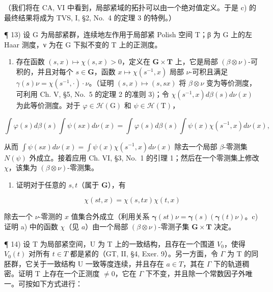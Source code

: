 （我们将在 CA, VI 中看到，局部紧域的拓扑可以由一个绝对值定义。于是 c) 的最终结果将成为 TVS, I, §2, No.~4 的定理 3 的特例。）

¶ 13) 设 G 为局部紧群，连续地左作用于局部紧 Polish 空间 T；β 为 G 上的左 Haar 测度，ν 为在 G 下拟不变的 T 上的正测度。

\begin{enumerate}
\def\labelenumi{\alph{enumi})}
\tightlist
\item
  存在函数 \((s,x)\mapsto \chi (s,x) > 0\)，定义在 \(\mathbf{G}\times \mathbf{T}\) 上，它是局部 \((\beta \otimes \nu)\)-可积的，并且对每个 \(s\in \mathbf{G}\)，函数 \(x\mapsto \chi (s^{-1},x)\) 局部 \(\nu\)-可积且满足 \(\gamma(s)\nu = \chi(s^{-1},\cdot)\cdot\nu\)。（证明 \((s,x)\mapsto(s,sx)\) 将 \(\beta\otimes\nu\) 变为等价测度，可利用 Ch. V, §5, No.~5 的定理 2 的准则 3)；令 \(\chi(s^{-1},x)d\beta(s)d\nu(x)\) 为此等价测度。对于 \(\varphi\in\mathcal{H}(\mathrm{G})\) 和 \(\psi\in\mathcal{H}(\mathrm{T})\)，
\end{enumerate}

\[
\int \varphi (s) d \beta (s) \int \psi (s x) d \nu (x) = \int \varphi (s) d \beta (s) \int \psi (x) \chi (s ^ {- 1}, x) d \nu (x),
\]

从而 \(\int \psi(sx) d\nu(x) = \int \psi(x)\chi(s^{-1}, x) d\nu(x)\) 除去一个局部 \(\beta\)-零测集 \(N(\psi)\) 外成立。接着应用 Ch. VI, §3, No.~1 的引理 1；然后在一个零测集上修改 \(\chi\)，该集为 \((\beta \otimes \nu)\)-零测集。

\begin{enumerate}
\def\labelenumi{\alph{enumi})}
\setcounter{enumi}{1}
\tightlist
\item
  证明对于任意的 \(s, t\)（属于 \(\mathbf{G}\)），有
\end{enumerate}

\[
\chi (s t, x) = \chi (s, t x) \chi (t, x)
\]

除去一个 \(\nu\)-零测的 \(x\) 值集合外成立（利用关系 \(\pmb{\gamma}(st)\nu = \pmb{\gamma}(s)(\pmb{\gamma}(t)\nu)\)。c) 证明 a) 中的函数 \(\chi\)（见 \(a\)）由一个局部 \((\beta \otimes \nu)\)-零测子集 \(\mathbf{G} \times \mathbf{T}\) 决定。

¶ 14) 设 T 为局部紧空间，U 为 T 上的一致结构，且存在一个围道 \(V_{0}\)，使得 \(V_{0}(t)\) 对所有 \(t \in T\) 都是紧的（GT, II, §4, Exer. 9）。另一方面，令 \(\Gamma\) 为 T 的同胚群，它关于一致结构 U 一致等度连续，并且存在 \(a \in T\)，其在 \(\Gamma\) 下的轨道稠密。证明 T 上存在一个正测度 \(\neq 0\)，它在 \(\Gamma\) 下不变，并且除一个常数因子外唯一。可按如下方式进行：


